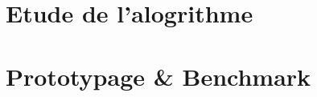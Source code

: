 \begin{frame}[fragile=singleslide]{\insertsectionhead}
  \framesubtitle{\insertsubsectionhead}
\end{frame}

\section{Etude de l'alogrithme}

\section{Prototypage \& Benchmark}
